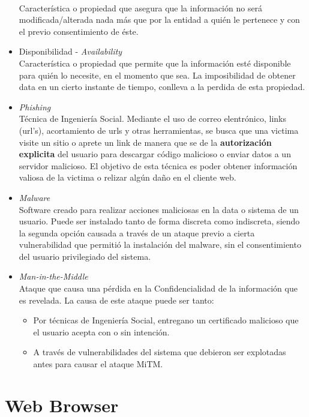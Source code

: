 \begin{itemize}
        \\Característica o propiedad que asegura que la información no será modificada/alterada nada más que por la entidad a quién le pertenece y con el previo consentimiento de éste.
    \item Disponibilidad - \textit{Availability}
        \\Característica o propiedad que permite que la información esté disponible para quién lo necesite, en el momento que sea. La imposibilidad de obtener data en un cierto instante de tiempo, conlleva a la perdida de esta propiedad.
    \item \textit{Phishing}
        \\Técnica de Ingeniería Social. Mediante el uso de correo elentrónico, links (url's), acortamiento de urls y otras herramientas, se busca que una victima visite un sitio o aprete un link de manera que se de la \textbf{autorización explicita} del usuario para descargar código malicioso o enviar datos a un servidor malicioso. El objetivo de esta técnica es poder obtener información valiosa de la victima o relizar algún daño en el cliente web.
    \item \textit{Malware}
        \\Software creado para realizar acciones maliciosas en la data o sistema de un usuario. Puede ser instalado tanto de forma discreta como indiscreta, siendo la segunda opción causada a través de un ataque previo a cierta vulnerabilidad que permitió la instalación del malware, sin el consentimiento del usuario privilegiado del sistema.
    \item \textit{Man-in-the-Middle}
        \\Ataque que causa una pérdida en la Confidencialidad de la información que es revelada. La causa de este ataque puede ser tanto:
            \begin{itemize}
                \item Por técnicas de Ingeniería Social, entregano un certificado malicioso que el usuario acepta con o sin intención.
                \item A través de vulnerabilidades del sistema que debieron ser explotadas antes para causar el ataque MiTM.
            \end{itemize}
\end{itemize}


\section{Web Browser}
\label{chap2:Browser}

